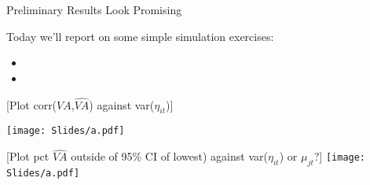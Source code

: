 \documentclass[t,aspectratio=169,11pt]{beamer}
\newenvironment{wideitemize}{\itemize\addtolength{\itemsep}{14pt}}{\enditemize}
\begin{document}
\begin{frame}{Preliminary Results Look Promising}


\begin{wideitemize}
\item Today we'll report on some simple simulation exercises:
\begin{itemize}
    \item
    \item 
\end{itemize}
\item
\end{wideitemize}
\end{frame}

\begin{frame}{[Plot corr($VA$,$\hat{VA}$) against var($\eta_{it}$)]} %

\centering
{}
\texttt{[image: Slides/a.pdf]}

\end{frame}


\begin{frame}{[Plot pct $\hat{VA}$ outside of 95\% CI of lowest) against var($\eta_{it}$) or $\mu_{jt}$?]} 
\centering
{}
\texttt{[image: Slides/a.pdf]}

\end{frame}


\end{document}

